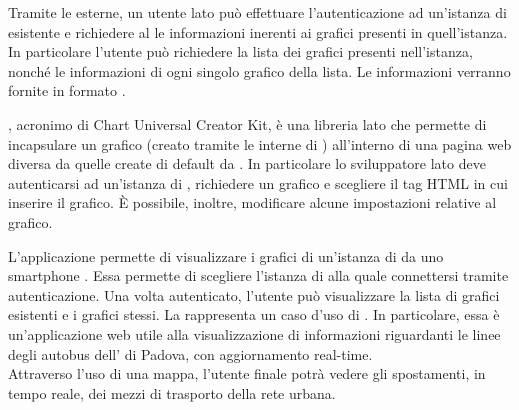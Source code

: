             Tramite le  esterne, un utente lato  può effettuare l'autenticazione ad un'istanza di  esistente e richiedere al  le informazioni inerenti ai grafici presenti in quell'istanza. In particolare l'utente  può richiedere la lista dei grafici presenti nell'istanza, nonché le informazioni di ogni singolo grafico della lista. Le informazioni verranno fornite in formato .

        , acronimo di Chart Universal Creator Kit, è una libreria  lato  che permette di incapsulare un grafico (creato tramite le  interne di ) all'interno di una pagina web diversa da quelle create di default da . In particolare lo sviluppatore lato  deve autenticarsi ad un'istanza di , richiedere un grafico e scegliere il tag HTML in cui inserire il grafico. È possibile, inoltre, modificare alcune impostazioni relative al grafico.
    
        L'applicazione  permette di visualizzare i grafici di un'istanza di  da uno smartphone . Essa permette di scegliere l'istanza di  alla quale connettersi tramite autenticazione. Una volta autenticato, l'utente può visualizzare la lista di grafici esistenti e i grafici stessi.
        La  rappresenta un caso d'uso di \projectname{}. In particolare, essa è un'applicazione web utile alla visualizzazione di informazioni riguardanti le linee degli autobus dell' di Padova, con aggiornamento real-time.\\
        Attraverso l'uso di una mappa, l'utente finale potrà vedere gli spostamenti, in tempo reale, dei mezzi di trasporto della rete urbana.\\
    
